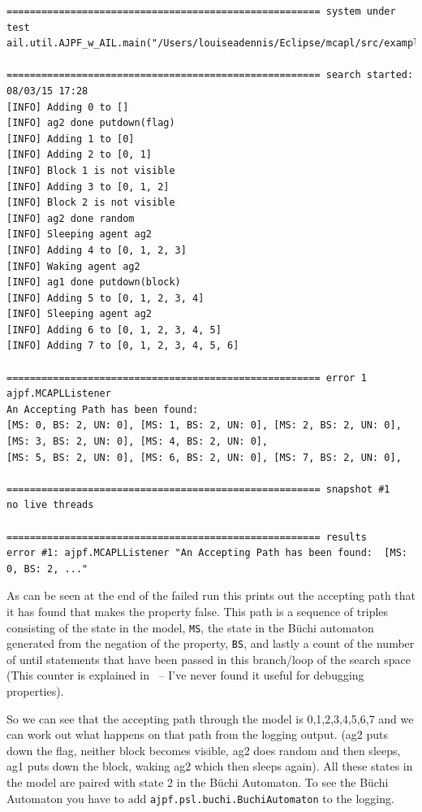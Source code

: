 \begin{footnotesize}
\begin{verbatim}
====================================================== system under test
ail.util.AJPF_w_AIL.main("/Users/louiseadennis/Eclipse/mcapl/src/examples/gwendolen/ajpf_tutorials/tutorial2/TwoPickUpAgents.ail","/Users/louiseadennis/Eclipse/mcapl/src/examples/gwendolen/ajpf_tutorials/tutorial2/PickUpAgent.psl","2")

====================================================== search started: 08/03/15 17:28
[INFO] Adding 0 to []
[INFO] ag2 done putdown(flag)
[INFO] Adding 1 to [0]
[INFO] Adding 2 to [0, 1]
[INFO] Block 1 is not visible
[INFO] Adding 3 to [0, 1, 2]
[INFO] Block 2 is not visible
[INFO] ag2 done random
[INFO] Sleeping agent ag2
[INFO] Adding 4 to [0, 1, 2, 3]
[INFO] Waking agent ag2
[INFO] ag1 done putdown(block)
[INFO] Adding 5 to [0, 1, 2, 3, 4]
[INFO] Sleeping agent ag2
[INFO] Adding 6 to [0, 1, 2, 3, 4, 5]
[INFO] Adding 7 to [0, 1, 2, 3, 4, 5, 6]

====================================================== error 1
ajpf.MCAPLListener
An Accepting Path has been found: 
[MS: 0, BS: 2, UN: 0], [MS: 1, BS: 2, UN: 0], [MS: 2, BS: 2, UN: 0], [MS: 3, BS: 2, UN: 0], [MS: 4, BS: 2, UN: 0],
[MS: 5, BS: 2, UN: 0], [MS: 6, BS: 2, UN: 0], [MS: 7, BS: 2, UN: 0], 

====================================================== snapshot #1
no live threads

====================================================== results
error #1: ajpf.MCAPLListener "An Accepting Path has been found:  [MS: 0, BS: 2, ..."
\end{verbatim}
\end{footnotesize}

As can be seen at the end of the failed run this prints out the accepting path that it has found that makes the property false.  This path is a sequence of triples consisting of the state in the model, \texttt{MS}, the state in the B\"{u}chi automaton generated from the negation of the property, \texttt{BS}, and lastly a count of the number of until statements that have been passed in this branch/loop of the search space (This counter is explained in~\cite{Gerth:1995:SOA:645837.670574} -- I've never found it useful for debugging properties).

So we can see that the accepting path through the model is 0,1,2,3,4,5,6,7 and we can work out what happens on that path from the logging output.  (ag2 puts down the flag, neither block becomes visible, ag2 does random and then sleeps, ag1 puts down the block, waking ag2 which then sleeps again).  All these states in the model are paired with state 2 in the B\"{u}chi Automaton.  To see the B\"{u}chi Automaton you have to add \texttt{ajpf.psl.buchi.BuchiAutomaton} to the logging.

